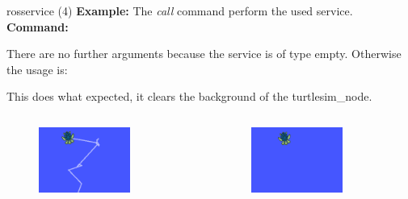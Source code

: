 \documentclass{beamer}
\begin{document}
\begin{frame}{rosservice (4)}
	\textbf{Example:} The \textit{call} command perform the used service.
	\textbf{Command:} 
	
	There are no further arguments because the service is of type empty.
	\newline
	Otherwise the usage is:
	
	This does what expected, it clears the background of the turtlesim\_node.
	\begin{columns}
		\begin{column}{0.5\textwidth}
			\begin{figure}[h!]
				\includegraphics[width = 0.7\textwidth]{./images/turtle_line.png}
			\end{figure}
		\end{column}
		\begin{column}{0.5\textwidth}
			\begin{figure}[h!]
				\includegraphics[width = 0.7\textwidth]{./images/turtle_clear.png}
			\end{figure}
		\end{column}
	\end{columns}
\end{frame}
\end{document}
